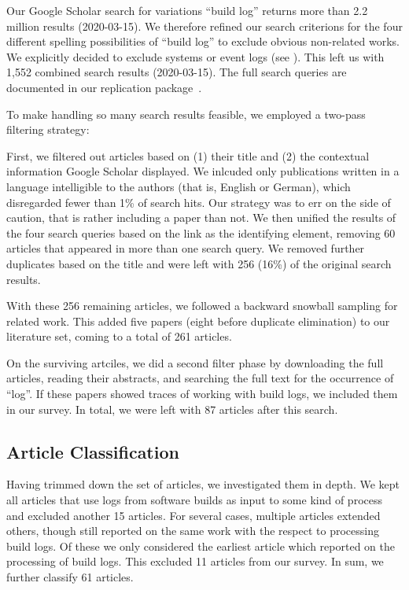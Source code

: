 Our Google Scholar
search for variations ``build log'' returns more than 2.2 million results
(2020-03-15).
We therefore refined our search criterions for the four
different spelling possibilities of ``build log'' to exclude obvious
non-related works.
We explicitly decided to exclude systems
or event logs (see ).
This left us with 1,552 combined search results
(2020-03-15).
The full search queries are documented in our replication
package~\cite{brandt2020chunk-replication}.

To make handling so many search results feasible, we employed a
two-pass filtering strategy:

First, we filtered out articles based on (1) their title and (2) the
contextual information Google Scholar displayed.
We inlcuded only
publications written in a language intelligible to the authors (that
is, English or German), which disregarded fewer than 1\% of search
hits.
Our strategy was to err on the side of
caution, that is rather including a paper than not.
We then unified
the results of the four search queries based on the link as the
identifying element, removing 60 articles that appeared in more than
one search query.
We removed further duplicates based on the title and were
left with 256 (16\%) of the original search results.

With these 256 remaining articles, we followed a backward snowball
sampling for related work.
This added five papers (eight before
duplicate elimination) to our literature set, coming to a total of 261
articles.

On the surviving artciles, we did a second filter phase by downloading the
full articles, reading their abstracts, and searching the full text
for the occurrence of ``log''.
If these papers showed traces of
working with build logs, we included them in our survey.
In total, we
were left with 87 articles after this search.

\subsection{Article Classification}
Having trimmed down the set of articles, we investigated them in depth.
We kept all articles that use logs from software builds as input to
some kind of process and excluded another 15 articles.
For several cases, multiple articles extended others, though still
reported on
the same work with the respect to processing build logs.
Of these we only considered the earliest article which reported on
the processing of build logs.
This excluded 11 articles from our survey.
In sum, we further classify 61 articles.

